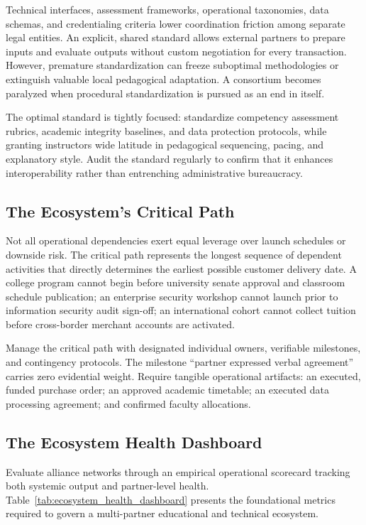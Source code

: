 Technical interfaces, assessment frameworks, operational taxonomies, data schemas, and credentialing criteria lower coordination friction among separate legal entities. An explicit, shared standard allows external partners to prepare inputs and evaluate outputs without custom negotiation for every transaction. However, premature standardization can freeze suboptimal methodologies or extinguish valuable local pedagogical adaptation. A consortium becomes paralyzed when procedural standardization is pursued as an end in itself.

The optimal standard is tightly focused: standardize competency assessment rubrics, academic integrity baselines, and data protection protocols, while granting instructors wide latitude in pedagogical sequencing, pacing, and explanatory style. Audit the standard regularly to confirm that it enhances interoperability rather than entrenching administrative bureaucracy.

\subsection{The Ecosystem's Critical Path}
\label{sec:ecosystems_critical_path}

Not all operational dependencies exert equal leverage over launch schedules or downside risk. The critical path represents the longest sequence of dependent activities that directly determines the earliest possible customer delivery date. A college program cannot begin before university senate approval and classroom schedule publication; an enterprise security workshop cannot launch prior to information security audit sign-off; an international cohort cannot collect tuition before cross-border merchant accounts are activated.

Manage the critical path with designated individual owners, verifiable milestones, and contingency protocols. The milestone ``partner expressed verbal agreement'' carries zero evidential weight. Require tangible operational artifacts: an executed, funded purchase order; an approved academic timetable; an executed data processing agreement; and confirmed faculty allocations.

\subsection{The Ecosystem Health Dashboard}
\label{sec:ecosystem_health_dashboard}

Evaluate alliance networks through an empirical operational scorecard tracking both systemic output and partner-level health. Table~\ref{tab:ecosystem_health_dashboard} presents the foundational metrics required to govern a multi-partner educational and technical ecosystem.

